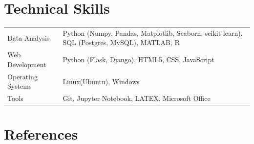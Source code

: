 \documentclass[a4paper,12pt]{article}
\begin{document}
\section{Technical Skills}
\begin{tabularx}{\linewidth}{@{}l X@{}}
    Data Analysis &  \normalsize{Python (Numpy, Pandas, Matplotlib, Seaborn, scikit-learn), SQL (Postgres, MySQL), MATLAB, R}\\
    Web Development &  \normalsize{Python (Flask, Django), HTML5, CSS, JavaScript}\\
    Operating Systems &  \normalsize{Linux(Ubuntu), Windows}\\  
    Tools &  \normalsize{Git, Jupyter Notebook, LATEX, Microsoft Office}\\ 
    
\end{tabularx}

    


\section{References}
\end{document}
